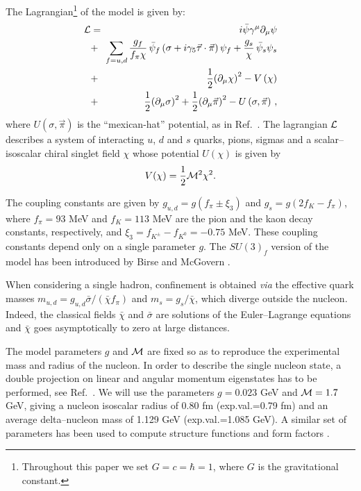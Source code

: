 The Lagrangian\footnote{
Throughout this paper we set $G=c=\hbar=1$, where $G$ is the gravitational 
constant.}
of the model is given by:
\begin{eqnarray}
     {\cal L} &=& i\bar \psi \gamma^{\mu}\partial_{\mu} \psi \nonumber\\
     &+&\!\!\!\sum_{f=u,d} {g_f\over f_\pi \chi} \, \bar \psi_f\left(\sigma
     +i\gamma_5\vec\tau\cdot\vec\pi\right) \psi_f 
     +{g_s \over \chi} \, \bar \psi_s \psi_s       \nonumber
     \\
      &+&{1\over 2}{\left(\partial_\mu\chi\right)}^2
      -V \left(\chi\right) \\
     \label{eq:in1}
     &+&{1\over 2}{\left(\partial_\mu\sigma \right)}^2
     +{1\over 2}{\left(\partial_\mu\vec\pi\right)}^2
     -U\left(\sigma ,\vec\pi\right)   \nonumber\, ,
\end{eqnarray}
where $U(\sigma ,\vec\pi)$ is the ``mexican-hat'' potential, as in
Ref.\ \cite{NF93}.
The lagrangian ${\cal L}$  
describes a system of interacting $u$, $d$ and $s$ quarks, pions, sigmas and
a scalar--isoscalar chiral singlet field $\chi$
whose potential $U(\chi)$ is given by
\begin{equation}
    V(\chi)={1\over 2}{\cal M}^2\chi^2.
    \label{eq:in2}
\end{equation}
 
The coupling constants are given by $g_{u,d}=g (f_{\pi}\pm \xi_3)$
and $g_s= g(2 f_K -f_{\pi})$, where $f_{\pi}=93$ MeV and $f_{K}=113$ MeV 
are the pion and the kaon 
decay constants, respectively, and $\xi_3=f_{K^\pm}-f_{K^0}=-0.75$ MeV. 
These coupling constants depend 
only on a single parameter $g$.
The $SU(3)_f$ version of the model has been
introduced by Birse and McGovern \cite{su3,su3col}.

When considering a single hadron,
confinement is obtained {\it via} the effective quark masses
$m_{u,d}=g_{u,d} \bar\sigma/(\bar\chi f_\pi)$ and 
$m_s=g_s / \bar\chi$,
which diverge outside the nucleon.
Indeed, the classical fields
$\bar \chi$ and $\bar\sigma$ are solutions of the Euler--Lagrange equations
and
$\bar\chi$ goes asymptotically to zero at large distances.

The model parameters $g$ and ${\cal M}$ are fixed so as to 
reproduce the experimental mass and radius of the nucleon.
In order to describe the single nucleon state, a double projection on linear
and angular momentum eigenstates has to be performed, see Ref.\
\cite{NF93}.
We will use the parameters $g=0.023$ GeV and
${\cal M}=1.7$ GeV, giving a nucleon isoscalar radius of 0.80 fm 
(exp.val.=0.79 fm) and an average
delta--nucleon mass of 1.129 GeV (exp.val.=1.085 GeV). A similar set
of parameters has been used to compute structure functions \cite{barone}
and form factors \cite{ff}.

